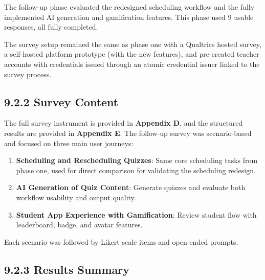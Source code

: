 \documentclass[
  12pt,
  a4paper,
]{report}
\begin{document}
The follow-up phase evaluated the redesigned scheduling workflow and the
fully implemented AI generation and gamification features. This phase
used 9 usable responses, all fully completed.

The survey setup remained the same as phase one with a Qualtrics hosted survey,
a self-hosted platform prototype (with the new features), and pre-created teacher accounts
with credentials issued through an atomic credential issuer linked to the survey process.

\hypertarget{survey-content-follow-up-phase}{%
\subsection{9.2.2 Survey Content}\label{survey-content-follow-up-phase}}

The full survey instrument is provided in \textbf{Appendix D}, and the
structured results are provided in \textbf{Appendix E}. The follow-up
survey was scenario-based and focused on three main user journeys:

\begin{enumerate}
\def\labelenumi{\arabic{enumi}.}
\item
  \textbf{Scheduling and Rescheduling Quizzes}: Same core scheduling
  tasks from phase one, used for direct comparison for validating the
  scheduling redesign.
\item
  \textbf{AI Generation of Quiz Content}: Generate quizzes and evaluate
  both workflow usability and output quality.
\item
  \textbf{Student App Experience with Gamification}: Review student flow
  with leaderboard, badge, and avatar features.
\end{enumerate}

Each scenario was followed by Likert-scale items and open-ended prompts.

\hypertarget{quantitative-results-summary-1}{%
\subsection{9.2.3 Results Summary}\label{quantitative-results-summary-1}}
\end{document}
